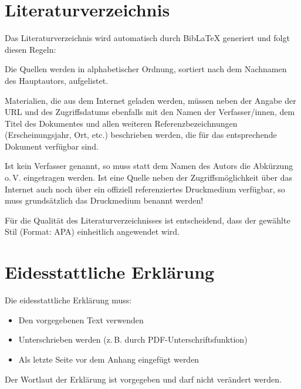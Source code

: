 \section{Literaturverzeichnis}
\label{sec:literaturverzeichnis_format}

Das Literaturverzeichnis wird automatisch durch BibLaTeX generiert und folgt diesen Regeln:

Die Quellen werden in alphabetischer Ordnung, sortiert nach dem Nachnamen des Hauptautors, aufgelistet.

Materialien, die aus dem Internet geladen werden, müssen neben der Angabe der URL und des Zugriffsdatums ebenfalls mit den Namen der Verfasser/innen, dem Titel des Dokumentes und allen weiteren Referenzbezeichnungen (Erscheinungsjahr, Ort, etc.) beschrieben werden, die für das entsprechende Dokument verfügbar sind.

Ist kein Verfasser genannt, so muss statt dem Namen des Autors die Abkürzung o.\,V. eingetragen werden. Ist eine Quelle neben der Zugriffsmöglichkeit über das Internet auch noch über ein offiziell referenziertes Druckmedium verfügbar, so muss grundsätzlich das Druckmedium benannt werden!

Für die Qualität des Literaturverzeichnisses ist entscheidend, dass der gewählte Stil (Format: APA) einheitlich angewendet wird.

\section{Eidesstattliche Erklärung}
\label{sec:eidesstattliche_erklaerung}

Die eidesstattliche Erklärung muss:
\begin{itemize}
	\item Den vorgegebenen Text verwenden
	\item Unterschrieben werden (z.\,B. durch PDF-Unterschriftsfunktion)
	\item Als letzte Seite vor dem Anhang eingefügt werden
\end{itemize}

Der Wortlaut der Erklärung ist vorgegeben und darf nicht verändert werden.

